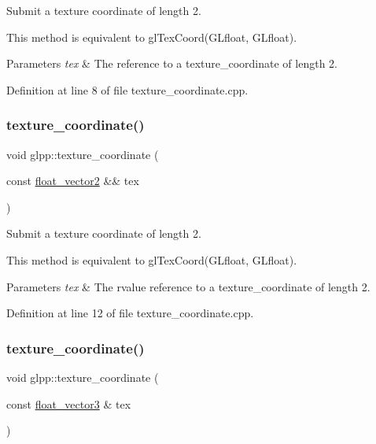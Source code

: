 Submit a texture coordinate of length 2. 

This method is equivalent to gl\+Tex\+Coord(\+G\+Lfloat, G\+Lfloat).


\begin{DoxyParams}{Parameters}
{\em tex} & The reference to a texture\+\_\+coordinate of length 2. \\
\hline
\end{DoxyParams}


Definition at line 8 of file texture\+\_\+coordinate.\+cpp.

\mbox{\label{namespaceglpp_a5bd5c10e292b241cd3a73243cd2e3bd6}} 
\subsubsection{\texorpdfstring{texture\+\_\+coordinate()}{texture\_coordinate()}\hspace{0.1cm}{\footnotesize\ttfamily [2/8]}}
{\footnotesize\ttfamily void glpp\+::texture\+\_\+coordinate (\begin{DoxyParamCaption}\item[{const \hyperlink{namespaceglpp_ace2f7da7495fc7d1623d97a444c87146}{float\+\_\+vector2} \&\&}]{tex }\end{DoxyParamCaption})\hspace{0.3cm}{\ttfamily [noexcept]}}



Submit a texture coordinate of length 2. 

This method is equivalent to gl\+Tex\+Coord(\+G\+Lfloat, G\+Lfloat).


\begin{DoxyParams}{Parameters}
{\em tex} & The rvalue reference to a texture\+\_\+coordinate of length 2. \\
\hline
\end{DoxyParams}


Definition at line 12 of file texture\+\_\+coordinate.\+cpp.

\mbox{\label{namespaceglpp_af144ad1b5dae895e0a5a57f3660d1eaa}} 
\subsubsection{\texorpdfstring{texture\+\_\+coordinate()}{texture\_coordinate()}\hspace{0.1cm}{\footnotesize\ttfamily [3/8]}}
{\footnotesize\ttfamily void glpp\+::texture\+\_\+coordinate (\begin{DoxyParamCaption}\item[{const \hyperlink{namespaceglpp_a3fa7b207a8b7dba583fb22731a616d73}{float\+\_\+vector3} \&}]{tex }\end{DoxyParamCaption})\hspace{0.3cm}{\ttfamily [noexcept]}}



